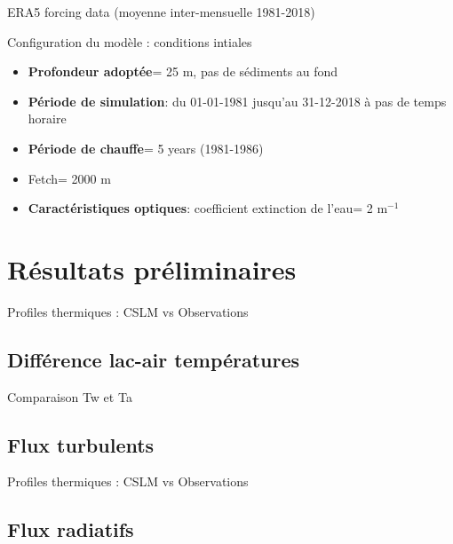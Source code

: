 \documentclass[german,12pt]{beamer}
\begin{document}
\begin{frame}{ERA5 forcing data (moyenne inter-mensuelle 1981-2018)}

\end{frame}
\begin{frame}{Configuration du modèle : conditions intiales}

\begin{itemize}
\item<1->{\textbf{Profondeur adoptée}= 25 m, pas de sédiments au fond}
\item<2->{\textbf{Période de simulation}: du 01-01-1981 jusqu'au 31-12-2018 à pas de temps horaire}
\item<3->{\textbf{Période de chauffe}= 5 years (1981-1986)}
\item<4->{Fetch= 2000 m}
\item<5-> {\textbf{Caractéristiques optiques}: coefficient extinction  de l'eau= 2 m$^{-1}$}
\end{itemize}
\end{frame}

\section{Résultats préliminaires}
\begin{frame}{Profiles thermiques : CSLM vs Observations}
\end{frame}

\subsection{Différence lac-air températures}
\begin{frame}{Comparaison Tw et Ta}
\end{frame}
\subsection{Flux turbulents}
\begin{frame}{Profiles thermiques : CSLM vs Observations}
\end{frame}
\subsection{Flux radiatifs}
\end{document}
